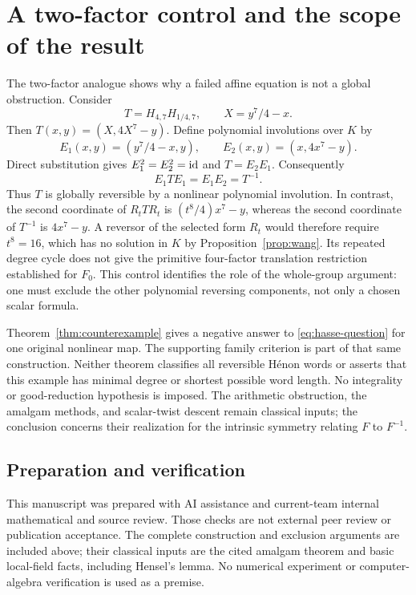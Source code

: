 \section{A two-factor control and the scope of the result}
\label{sec:control}

The two-factor analogue shows why a failed affine equation is not a
global obstruction. Consider
\[
  T=H_{4,7}H_{1/4,7},\qquad X=y^7/4-x.
\]
Then $T(x,y)=(X,4X^7-y)$. Define polynomial involutions over $K$ by
\[
  E_1(x,y)=(y^7/4-x,y),\qquad
  E_2(x,y)=(x,4x^7-y).
\]
Direct substitution gives $E_1^2=E_2^2=\mathrm{id}$ and $T=E_2E_1$.
Consequently
\[
  E_1TE_1=E_1E_2=T^{-1}.
\]
Thus $T$ is globally reversible by a nonlinear polynomial
involution. In contrast, the second coordinate of $R_tTR_t$
is $(t^8/4)x^7-y$, whereas the second coordinate of $T^{-1}$
is $4x^7-y$. A reversor of the selected form $R_t$ would
therefore require $t^8=16$, which has no solution in $K$ by
Proposition~\ref{prop:wang}.
Its repeated degree cycle does not give the primitive four-factor
translation restriction established for $F_0$.
This control identifies the role of the whole-group argument:
one must exclude the other polynomial reversing components, not
only a chosen scalar formula.

Theorem~\ref{thm:counterexample} gives a negative answer to
\eqref{eq:hasse-question} for one original nonlinear map.
The supporting family criterion is part of that same construction.
Neither theorem classifies all reversible H\'enon words or asserts
that this example has minimal degree or shortest possible word
length. No integrality or good-reduction hypothesis is imposed.
The arithmetic obstruction, the amalgam methods, and scalar-twist
descent remain classical inputs; the conclusion concerns their
realization for the intrinsic symmetry relating $F$ to $F^{-1}$.

\subsection*{Preparation and verification}

This manuscript was prepared with AI assistance and current-team
internal mathematical and source review. Those checks are not
external peer review or publication acceptance.
The complete construction and exclusion arguments are included above;
their classical inputs are the cited amalgam theorem and basic
local-field facts, including Hensel's lemma.
No numerical experiment or computer-algebra verification is
used as a premise.
